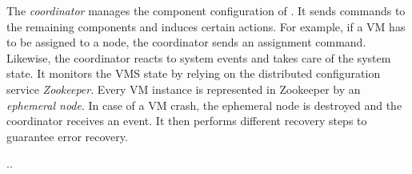 


The \textit{coordinator} manages the component configuration of
\VMS. It sends commands to the remaining components and induces certain
actions.  For example, if a VM has to be assigned to a node, the
coordinator sends an assignment command. Likewise, the coordinator
reacts to system events and takes care of the system state. It
monitors the VMS state by relying on the distributed configuration
service \textit{Zookeeper}. Every VM instance is represented in
Zookeeper by an \textit{ephemeral node}. In case of a VM crash, the
ephemeral node is destroyed and the coordinator receives an event. It
then performs different recovery steps to guarantee error recovery.

..

